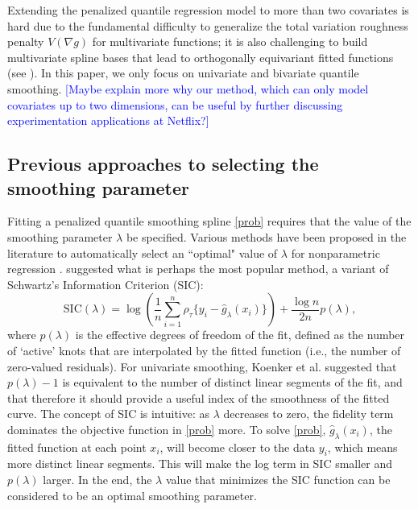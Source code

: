 \documentclass{statsoc}
\begin{document}
Extending the penalized quantile regression model to more than two covariates is hard due to the fundamental difficulty to generalize the total variation roughness penalty $V(\nabla g)$ for multivariate functions; it is also challenging to build multivariate spline bases that lead to orthogonally equivariant fitted functions (see \citet[p. 235]{koenker2005quantile}). In this paper, we only focus on univariate and bivariate quantile smoothing. \textcolor{blue}{[Maybe explain more why our method, which can only model covariates up to two dimensions, can be useful by further discussing experimentation applications at Netflix?]}

\subsection{Previous approaches to selecting the smoothing parameter}\label{refintro}

Fitting a penalized quantile smoothing spline \eqref{prob} requires that the value of the smoothing parameter $\lambda$ be specified. Various methods have been proposed in the literature to automatically select an ``optimal" value of $\lambda$ for nonparametric regression \citep{akaike1973problems,schwarz1978estimating}. \citet{koenker1994quantile} suggested what is perhaps the most popular method, a variant of Schwartz's Information Criterion (SIC):
\begin{equation}
    \mbox{SIC}(\lambda)=\log\left(\frac{1}{n} \sum_{i=1}^n \rho_{\tau}\{y_i - \hat g_{\lambda}(x_i)\}\right) + \frac{\log n}{2n}p(\lambda),
\end{equation}
 where $p(\lambda)$ is the effective degrees of freedom of the fit, defined as the number of `active' knots that are interpolated by the fitted function (i.e., the number of zero-valued residuals). For univariate smoothing, Koenker et al. suggested that  $p(\lambda)-1$ is equivalent to the number of distinct linear segments of the fit, and that therefore it should provide a useful index of the smoothness of the fitted curve. The concept of SIC is intuitive: as $\lambda$ decreases to zero, the fidelity term dominates the objective function in \eqref{prob} more. To solve \eqref{prob}, $\hat g_{\lambda}(x_i)$, the fitted function at each point $x_i$, will become closer to the data $y_i$, which means more distinct linear segments. This will make the log term in SIC smaller and $p(\lambda)$ larger. In the end, the $\lambda$ value that minimizes the SIC function can be considered to be an optimal smoothing parameter.
 
\end{document}
